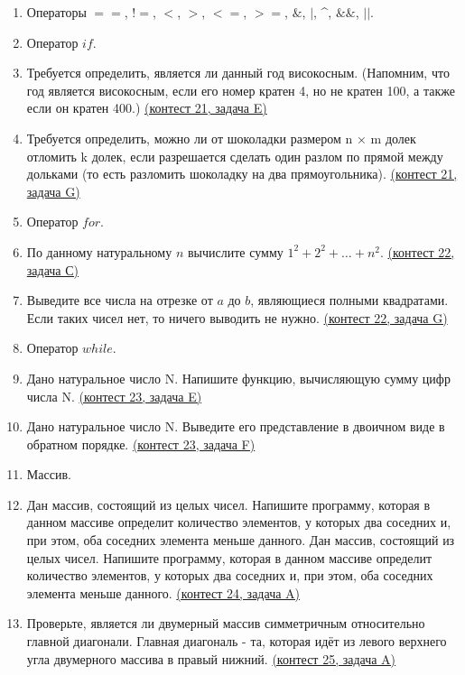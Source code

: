 \documentclass[a4paper,12pt]{article}
\begin{document}
\begin{enumerate}
\item Операторы $==$, $!=$, $<$, $>$, $<=$, $>=$, $\&$, $|$, \textasciicircum, $\&\&$, $||$.
\item Оператор $if$.
\item Требуется определить, является ли данный год високосным. (Напомним, что год является високосным, если его номер кратен 4, но не кратен 100, а также если он кратен 400.) \href{https://informatics.msk.ru/mod/statements/view3.php?chapterid=253}{(контест 21, задача E)}
\item Требуется определить, можно ли от шоколадки размером n × m долек отломить k долек, если разрешается сделать один разлом по прямой между дольками (то есть разломить шоколадку на два прямоугольника). \href{https://informatics.msk.ru/mod/statements/view3.php?chapterid=258}{(контест 21, задача G)}
\item Оператор $for$.
\item По данному натуральному $n$ вычислите сумму $1^2+2^2+\dots+n^2$. \href{https://informatics.msk.ru/mod/statements/view3.php?chapterid=315}{(контест 22, задача С)}
\item Выведите все числа на отрезке от $a$ до $b$, являющиеся полными квадратами. Если таких чисел нет, то ничего выводить не нужно. \href{https://informatics.msk.ru/mod/statements/view3.php?chapterid=335}{(контест 22, задача G)}
\item Оператор $while$.
\item Дано натуральное число N. Напишите функцию, вычисляющую сумму цифр числа N. \href{https://informatics.msk.ru/mod/statements/view3.php?chapterid=114}{(контест 23, задача E)}
\item Дано натуральное число N. Выведите его представление в двоичном виде в обратном порядке. \href{https://informatics.msk.ru/mod/statements/view3.php?chapterid=117}{(контест 23, задача F)}
\item Массив.
\item Дан массив, состоящий из целых чисел. Напишите программу, которая в данном массиве определит количество элементов, у которых два соседних и, при этом, оба соседних элемента меньше данного. Дан массив, состоящий из целых чисел. Напишите программу, которая в данном массиве определит количество элементов, у которых два соседних и, при этом, оба соседних элемента меньше данного. \href{https://informatics.msk.ru/mod/statements/view3.php?chapterid=68}{(контест 24, задача A)}
\item Проверьте, является ли двумерный массив симметричным относительно главной диагонали. Главная диагональ - та, которая идёт из левого верхнего угла двумерного массива в правый нижний. \href{https://informatics.msk.ru/mod/statements/view3.php?chapterid=355}{(контест 25, задача A)}

\end{enumerate}
\end{document}
